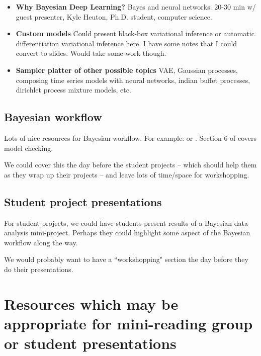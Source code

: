 \documentclass{article} %
\begin{document}
\begin{itemize}
\item \textbf{Why Bayesian Deep Learning?}  Bayes and neural networks.   20-30 min w/ guest presenter,  Kyle Heuton,  Ph.D.  student,  computer science.
\item \textbf{Custom models}  Could present black-box variational inference or automatic differentiation variational inference here.   I have some notes that I could convert to slides.  Would take some work though.  
\item \textbf{Sampler platter of other possible topics}   VAE,   Gaussian processes,  composing time series models with neural networks,  indian buffet processes,  dirichlet process mixture models,  etc.  
\end{itemize}

\subsection{Bayesian workflow}  \label{sec:Bayesian workflow}


Lots of nice resources for Bayesian workflow.    For example: \cite{gelman2020bayesian} or \cite{gabry2019visualization}.  Section 6 of \cite{gelman2013bayesian} covers model checking.       

We could cover this the day before the student projects -- which should help them as they wrap up their projects -- and leave lots of time/space for workshopping. 

\subsection{Student project presentations}

For student projects,  we could have students present results of a Bayesian data analysis mini-project.   Perhaps they could highlight some aspect of the Bayesian workflow along the way. 

We would probably want to have a ``workshopping" section the day before they do their presentations.


{}



\appendix

\section{Resources which may be appropriate for mini-reading group or student presentations}
\end{document}
